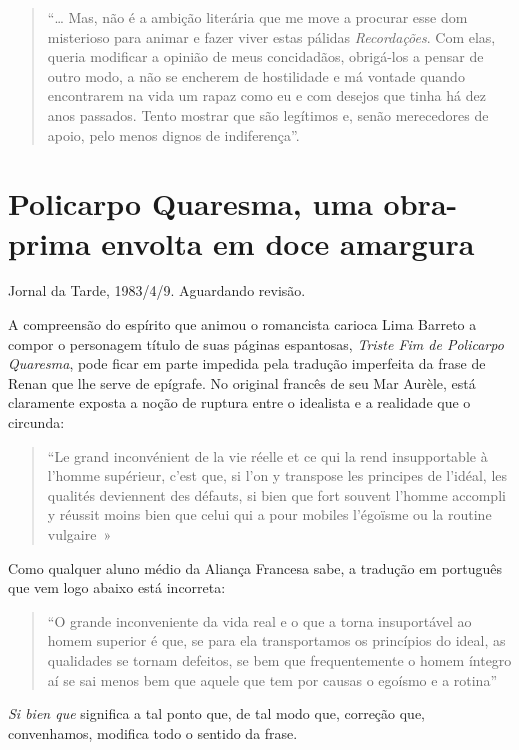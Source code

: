 \documentclass[
  letterpaper,
  DIV=11,
  numbers=noendperiod]{scrreprt}
\begin{document}
\begin{quote}
``\ldots{} Mas, não é a ambição literária que me move a procurar esse
dom misterioso para animar e fazer viver estas pálidas
\emph{Recordações}. Com elas, queria modificar a opinião de meus
concidadãos, obrigá-los a pensar de outro modo, a não se encherem de
hostilidade e má vontade quando encontrarem na vida um rapaz como eu e
com desejos que tinha há dez anos passados. Tento mostrar que são
legítimos e, senão merecedores de apoio, pelo menos dignos de
indiferença''.
\end{quote}

\chapter{Policarpo Quaresma, uma obra-prima envolta em doce
amargura}\label{policarpo-quaresma-uma-obra-prima-envolta-em-doce-amargura}

Jornal da Tarde, 1983/4/9. Aguardando revisão.

\hfill\break

A compreensão do espírito que animou o romancista carioca Lima Barreto a
compor o personagem título de suas páginas espantosas, \emph{Triste Fim
de Policarpo Quaresma}, pode ficar em parte impedida pela tradução
imperfeita da frase de Renan que lhe serve de epígrafe. No original
francês de seu Mar Aurèle, está claramente exposta a noção de ruptura
entre o idealista e a realidade que o circunda:

\begin{quote}
``Le grand inconvénient de la vie réelle et ce qui la rend insupportable
à l'homme supérieur, c'est que, si l'on y transpose les principes de
l'idéal, les qualités deviennent des défauts, si bien que fort souvent
l'homme accompli y réussit moins bien que celui qui a pour mobiles
l'égoïsme ou la routine vulgaire~»
\end{quote}

Como qualquer aluno médio da Aliança Francesa sabe, a tradução em
português que vem logo abaixo está incorreta:

\begin{quote}
``O grande inconveniente da vida real e o que a torna insuportável ao
homem superior é que, se para ela transportamos os princípios do ideal,
as qualidades se tornam defeitos, se bem que frequentemente o homem
íntegro aí se sai menos bem que aquele que tem por causas o egoísmo e a
rotina''
\end{quote}

\emph{Si bien que} significa a tal ponto que, de tal modo que, correção
que, convenhamos, modifica todo o sentido da frase.
\end{document}
